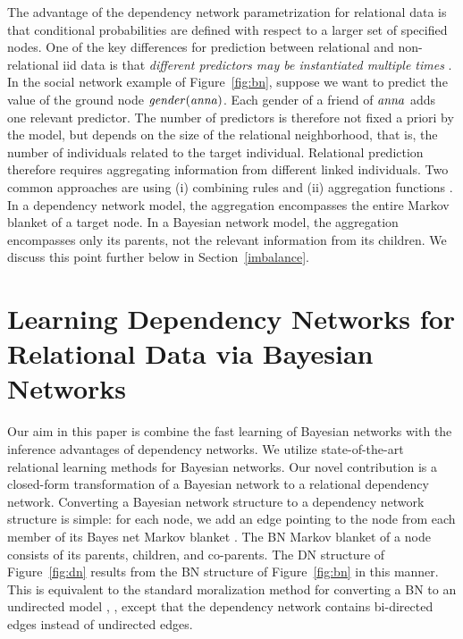 \documentclass[runningheads,a4paper]{llncs}
\begin{document}
The advantage of the dependency network parametrization for relational data is that conditional probabilities are defined with respect to a larger set of specified nodes. One of the key differences for prediction between relational and non-relational iid data is that {\em different predictors may be instantiated multiple times} \cite{Natarajan2008}. In the social network example of Figure~\ref{fig:bn}, suppose we want to predict the value of the ground node $\it{gender}(anna)$. Each gender of a friend of $\it{anna}$ adds one relevant predictor. The number of predictors is therefore not fixed a priori by the model, but depends on the size of the relational neighborhood, that is, the number of individuals related to the target individual. Relational prediction therefore requires aggregating information from different linked individuals. Two common approaches are using (i) combining rules \cite{Kersting2007} and (ii) aggregation functions \cite{Getoor2007c}. In a dependency network model, the aggregation encompasses the entire Markov blanket of a target node. In a Bayesian network model, the aggregation encompasses only its parents, not the relevant information from its children. We discuss this point further below in Section~\ref{imbalance}. 

 \section{Learning Dependency Networks for Relational Data via Bayesian Networks} Our aim in this paper is combine the fast learning of Bayesian networks with the inference advantages of dependency networks. We utilize state-of-the-art relational learning methods for Bayesian networks. Our novel contribution is a closed-form transformation of a Bayesian network to a relational dependency network. Converting a Bayesian network structure to a dependency network structure is simple: for each node, we add an edge pointing to the node from each member of its Bayes net Markov blanket \cite{Heckerman2000}. The BN Markov blanket of a node consists of its parents, children, and co-parents. The DN structure of Figure~\ref{fig:dn} results from the BN structure of Figure~\ref{fig:bn} in this manner. This is equivalent to the standard moralization  method for converting a BN to an undirected model \cite[12.5.3]{Domingos2007}, \cite{Lauritzen1996}, except that the dependency network contains bi-directed edges instead of undirected edges. 
 
\end{document}

